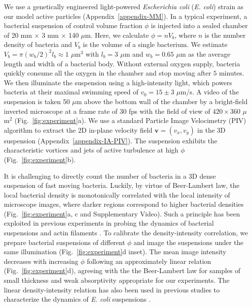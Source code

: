 \documentclass[twocolumn,aps,prx,amsmath,amssymb,longbibliography,superscriptaddress]{revtex4-2}
\begin{document}
We use a genetically engineered light-powered \textit{Escherichia coli} (\textit{E. coli}) strain as our model active particles (Appendix~\ref{appendix-MM}).
In a typical experiment, a bacterial suspension of control volume fraction $\phi$ is injected into a sealed chamber of 20 mm $\times$ 3 mm $\times$ 140 $\mu$m. Here, we calculate $\phi = n V_b$, where $n$ is the number density of bacteria and $V_b$ is the volume of a single bacterium. We estimate $V_b = \pi (w_b/2)^2 l_b \approx 1$ $\mu$m$^3$ with $l_b = 3$ $\mu$m and $w_b = 0.65$ $\mu$m as the average length and width of a bacterial body. Without external oxygen supply, bacteria quickly consume all the oxygen in the chamber and stop moving after $5$ minutes.
We then illuminate the suspension using a high-intensity light, which powers bacteria at their maximal swimming speed of $v_0 = 15 \pm 3$ $\mu$m/s. A video of the suspension is taken 50 $\mu$m above the bottom wall of the chamber by a bright-field inverted microscope at a frame rate of $30$ fps with the field of view of $420 \times 360$ $\mu$m$^2$ (Fig.~\ref{fig:experiment}a).
We use a standard Particle Image Velocimetry (PIV) algorithm
to extract the 2D in-plane velocity field $\bm{v} = (v_x,v_y)$ in the 3D suspension (Appendix~\ref{appendix-IA-PIV}). The suspension exhibits the characteristic vortices and jets of active turbulence at high $\phi$ (Fig.~\ref{fig:experiment}b).

It is challenging to directly count the number of bacteria in a 3D dense suspension of fast moving bacteria. Luckily, by virtue of Beer-Lambert law, the local bacterial density is monotonically correlated with the local intensity of microscope images, where darker regions correspond to higher bacterial densities (Fig.~\ref{fig:experiment}a, c and Supplementary Video). Such a principle has been exploited in previous experiments in probing the dynamics of bacterial suspensions and actin filaments \cite{Sokolov2009, Wilson2011, Schaller2013}. To calibrate the density-intensity correlation, we prepare bacterial suspensions of different $\phi$ and image the suspensions under the same illumination (Fig.~\ref{fig:experiment}d inset). The mean image intensity decreases with increasing $\phi$ following an approximately linear relation (Fig.~\ref{fig:experiment}d), agreeing with the the Beer-Lambert law for samples of small thickness and weak absorptivity appropriate for our experiments. The linear density-intensity relation has also been used in previous studies to characterize the dynamics of \textit{E. coli} suspensions \cite{Wilson2011}.
\end{document}

